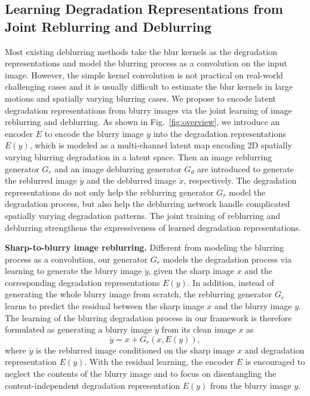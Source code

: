 \documentclass[runningheads]{llncs}
\begin{document}
\subsection{Learning Degradation Representations from Joint Reblurring and Deblurring} \label{sec31}
Most existing deblurring methods \cite{Learning_to_deblur,blind_dark_channel,blind_spectral,hyper_laplacian,total_variation} take the blur kernels as the degradation representations and model the blurring process as a convolution on the input image. However, the simple kernel convolution is not practical on real-world challenging cases and it is usually difficult to estimate the blur kernels in large motions and spatially varying blurring cases. 
We propose to encode latent degradation representations from blurry images via the joint learning of image reblurring and deblurring. 
As shown in Fig.~\ref{fig:overview}, we introduce an encoder $E$ to encode the blurry image $y$ into the degradation representations $E(y)$, which is modeled as a multi-channel latent map encoding 2D spatially varying blurring degradation in a latent space.
Then an image reblurring generator $G_r$ and an image deblurring generator $G_d$ are introduced to generate the reblurred image $\acute{y}$ and the deblurred image $\acute{x}$, respectively. 
The degradation representations do not only help the reblurring generator $G_r$ model the degradation process, but also help the deblurring network handle complicated spatially varying degradation patterns.
The joint training of reblurring and deblurring strengthens the expressiveness of learned degradation representations. 


\noindent\textbf{Sharp-to-blurry image reblurring.} 
Different from modeling the blurring process as a convolution, our generator $G_r$ models the degradation process via learning to generate the blurry image $\acute{y}$, given the sharp image $x$ and the corresponding degradation representations $E(y)$. 
In addition, instead of generating the whole blurry image from scratch, the reblurring generator $G_r$ learns to predict the residual between the sharp image $x$ and the blurry image $y$. 
The learning of the blurring degradation process in our framework is therefore formulated as generating a blurry image $\acute{y}$ from its clean image $x$ as
\begin{equation}
     \acute{y} = x + G_r(x, E(y)),
\end{equation}
where $\acute{y}$ is the reblurred image conditioned on the sharp image $x$ and degradation representation $E(y)$.
With the residual learning, the encoder $E$ is encouraged to neglect the contents of the blurry image and to focus on disentangling the content-independent degradation representation $E(y)$ from the blurry image $y$.
\end{document}
